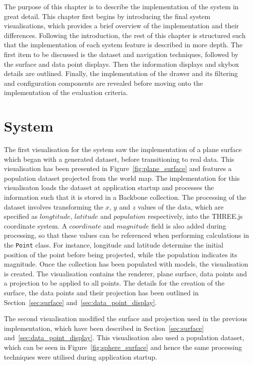 
The purpose of this chapter is to describe the implementation of the system in great detail. This chapter first begins by introducing the final system visualisations, which provides a brief overview of the implementation and their differences. Following the introduction, the rest of this chapter is structured such that the implementation of each system feature is described in more depth. The first item to be discussed is the dataset and navigation techniques, followed by the surface and data point displays. Then the information displays and skybox details are outlined. Finally, the implementation of the drawer and its filtering and configuration components are revealed before moving onto the implementation of the evaluation criteria.

\section{System} {
\label{sec:system}

	The first visualisation for the system saw the implementation of a plane surface which began with a generated dataset, before transitioning to real data. This visualisation has been presented in Figure~\ref{fig:plane_surface} and features a population dataset projected from the world map. The implementation for this visualisaton loads the dataset at application startup and processes the information such that it is stored in a Backbone collection. The processing of the dataset involves transforming the $x$, $y$ and $z$ values of the data, which are specified as $longtitude$, $latitude$ and $population$ respectively, into the THREE.js coordinate system. A $coordinate$ and $magnitude$ field is also added during processing, so that these values can be referenced when performing calculations in the \texttt{Point} class. For instance, longitude and latitude determine the initial position of the point before being projected, while the population indicates its magnitude. Once the collection has been populated with models, the visualisation is created. The visualisation contains the renderer, plane surface, data points and a projection to be applied to all points. The details for the creation of the surface, the data points and their projection has been outlined in Section~\ref{sec:surface} and~\ref{sec:data_point_display}.

	

	The second visualisation modified the surface and projection used in the previous implementation, which have been described in Section~\ref{sec:surface} and~\ref{sec:data_point_display}. This visualisation also used a population dataset, which can be seen in Figure~\ref{fig:sphere_surface} and hence the same processing techniques were utilised during application startup.

}
